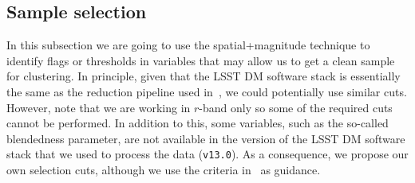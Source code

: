 \documentclass[twocolumn]{aastex62}
\begin{document}
\subsection{Sample selection}
\label{ssec:sample_selection}

In this subsection we are going to use the spatial+magnitude technique to identify flags or thresholds in variables that may allow us to get a clean sample for clustering. In principle, given that the LSST DM software stack is essentially the same as the reduction pipeline used in~\citet{2018PASJ...70S..25M}, we could potentially use similar cuts. However, note that we are working in $r$-band only so some of the required cuts cannot be performed. In addition to this, some variables, such as the so-called blendedness parameter, are not available in the version of the LSST DM software stack that we used to process the data (\texttt{v13.0}). As a consequence, we propose our own selection cuts, although we use the criteria in~\citet{2018PASJ...70S..25M} as guidance.
\end{document}
